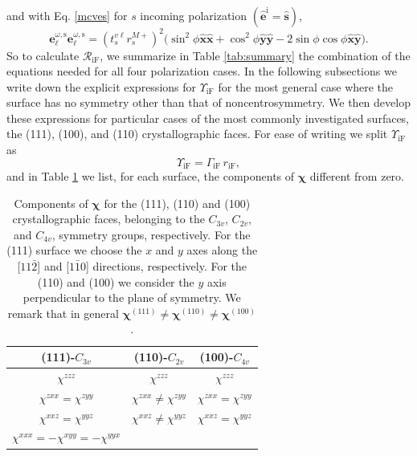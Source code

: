 and with Eq. \eqref{mcves} for $s$ incoming polarization $(\hat{\mathbf{e}}^{\mathrm{i}} = \hat{\mathbf{s}})$,
\begin{equation}\label{eq:ewewsmr}
\mathbf{e}^{\omega,\mathrm{s}}_{\ell}\mathbf{e}^{\omega,\mathrm{s}}_{\ell}
= \left(t^{v\ell}_{s}r^{M+}_{s}\right)^{2}
\big(
  \sin^{2}\phi\hat{\mathbf{x}}\hat{\mathbf{x}}
 + \cos^{2}\phi\hat{\mathbf{y}}\hat{\mathbf{y}}
 - 2\sin\phi\cos\phi\hat{\mathbf{x}}\hat{\mathbf{y}}
\big).
\end{equation}
So to calculate $\mathcal{R}_{\mathrm{iF}}$, we summarize in Table \ref{tab:summary} the combination of the equations needed for all four polarization cases. In the following subsections we write down the explicit expressions for $\Upsilon_{\mathrm{iF}}$ for the most general case where the surface has no symmetry other than that of noncentrosymmetry. We then develop these expressions for particular cases of the most commonly investigated surfaces, the (111), (100), and (110) crystallographic faces. For ease of writing we split $\Upsilon_{\mathrm{iF}}$ as
\begin{equation}\label{mc25}
\Upsilon_{\mathrm{iF}} = \Gamma_{\mathrm{iF}}\,r_{\mathrm{iF}},
\end{equation} 
and in Table \ref{chis} we list,  for each surface, the components of $\boldsymbol{\chi}$ different from zero.\cite{sipePRB87, popov95}
\begin{table}[t]
\begin{tabular}{|c|c|c|}
\hline 
(111)-$C_{3v}$     & (110)-$C_{2v}$  & (100)-$C_{4v}$ \\
\hline 
$\chi^{zzz}$ & $\chi^{zzz}$ & $\chi^{zzz}$\\
$\chi^{zxx}=\chi^{zyy}$ & $\chi^{zxx}\ne\chi^{zyy}$ & $\chi^{zxx}=\chi^{zyy}$\\
$\chi^{xxz}=\chi^{yyz}$ & $\chi^{xxz}\ne\chi^{yyz}$ & $\chi^{xxz}=\chi^{yyz}$\\
$\chi^{xxx}=-\chi^{xyy}=-\chi^{yyx}$ & &  \\
\hline 
\end{tabular}
\caption{Components of $\boldsymbol{\chi}$ for the (111), (110) and (100) crystallographic faces, belonging to the $C_{3v}$, $C_{2v}$, and $C_{4v}$, symmetry groups, respectively. For the (111) surface we choose the $x$ and $y$ axes along the [$11\bar{2}$] and [$1\bar{1}0$] directions, respectively. For the (110) and (100) we consider the $y$ axis perpendicular to the plane of symmetry.\cite{sipePRB87} We remark that in general $\boldsymbol{\chi}^{(111)}\ne \boldsymbol{\chi}^{(110)} \ne \boldsymbol{\chi}^{(100)}$.}
\label{chis}
\end{table}

